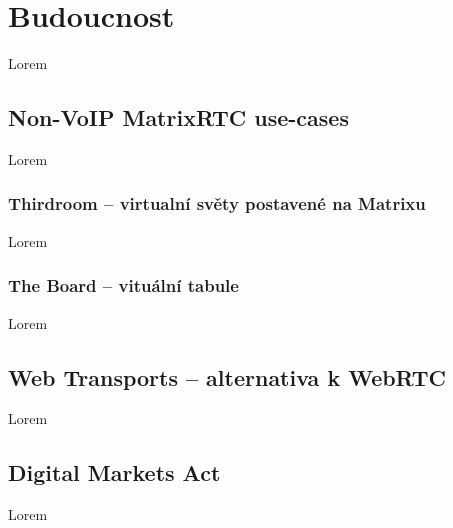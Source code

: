 \section{Budoucnost}\label{future}

Lorem

\subsection{Non-VoIP MatrixRTC use-cases}

Lorem

\subsubsection{Thirdroom -- virtualní světy postavené na Matrixu}\label{thirdroom}

Lorem

\subsubsection{The Board -- vituální tabule}

Lorem

\subsection{Web Transports -- alternativa k WebRTC}

Lorem

\subsection{Digital Markets Act}

Lorem
